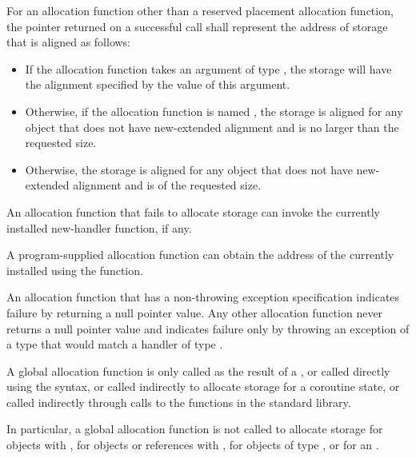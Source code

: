 \pnum
For an allocation function other than
a reserved placement allocation function,
the pointer returned on a successful call
shall represent the address of storage that is aligned as follows:
\begin{itemize}
\item
  If the allocation function takes an argument
  of type ,
  the storage will have the alignment specified
  by the value of this argument.
\item
  Otherwise, if the allocation function is named ,
  the storage is aligned for any object that
  does not have new-extended alignment and
  is no larger than the requested size.
\item
  Otherwise, the storage is aligned for any object that
  does not have new-extended alignment and is of the requested size.
\end{itemize}

\pnum
An allocation function that fails to allocate storage can invoke the
currently installed new-handler function, if any.
\begin{note}
%
A program-supplied allocation function can obtain the address of the
currently installed  using the
 function.
\end{note}
An allocation function that has a non-throwing
exception specification
indicates failure by returning
a null pointer value.
Any other allocation function
never returns a null pointer value and
indicates failure only by throwing an exception of a type
that would match a handler of type
.

\pnum
A global allocation function is only called as the result of a , or called directly using the 
syntax, or called indirectly to allocate storage for
a coroutine state,
or called indirectly through calls to the
functions in the \Cpp{} standard library.
\begin{note}
In particular, a
global allocation function is not called to allocate storage for objects
with , for objects or references
with , for objects of
type , or for an
.
\end{note}

